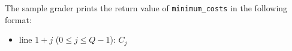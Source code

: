 The sample grader prints the return value of \texttt{minimum\_costs} in the following format:
\begin{itemize}
    \item line $1 + j$ ($0 \le j \le Q-1$): $C_j$
\end{itemize}



